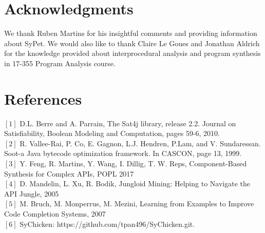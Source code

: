 \documentclass[twocolumn]{article}
\begin{document}
\section*{Acknowledgments}
We thank Ruben Martins for his insightful comments and providing information about SyPet.
We would also like to thank Claire Le Goues and Jonathan Aldrich for the knowledge provided about interprocedural analysis and program synthesis in 17-355 Program Analysis course.\\

\section*{References}
$[1]$ D.L. Berre and A. Parrain, The Sat4j library, release 2.2. Journal on Satisfiability, Boolean Modeling and Computation, pages 59-6, 2010.\\
$[2]$ R. Vallee-Rai, P. Co, E. Gagnon, L.J. Hendren, P.Lam, and V. Sundaressan. Soot-a Java bytecode optimization framework. In CASCON, page 13, 1999.\\
$[3]$ Y. Feng, R. Martins, Y. Wang, I. Dillig, T. W. Reps, Component-Based Synthesis for Complex APIs, POPL 2017\\
$[4]$ D. Mandelin, L. Xu, R. Bodik, Jungloid Mining: Helping to Navigate the API Jungle, 2005\\
$[5]$ M. Bruch, M. Monperrus, M. Mezini, Learning from Examples to Improve Code Completion Systems, 2007\\
$[6]$ SyChicken: https://github.com/tpan496/SyChicken.git.
\end{document}
